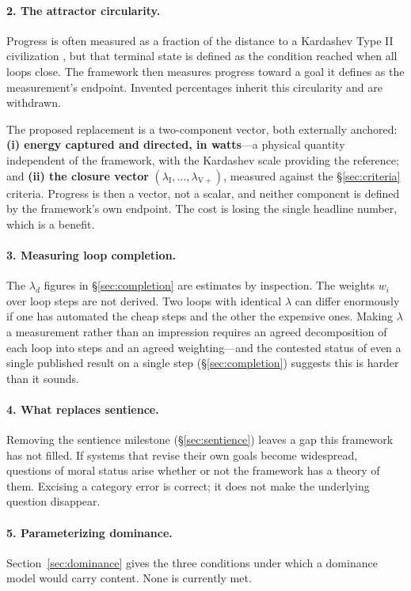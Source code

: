 \documentclass[11pt]{article}
\begin{document}
\paragraph{2. The attractor circularity.} Progress is often measured as a fraction of the distance to a Kardashev Type II civilization \citep{kardashev1964}, but that terminal state is defined as the condition reached when all loops close. The framework then measures progress toward a goal it defines as the measurement's endpoint. Invented percentages inherit this circularity and are withdrawn.

The proposed replacement is a two-component vector, both externally anchored: \textbf{(i) energy captured and directed, in watts}---a physical quantity independent of the framework, with the Kardashev scale providing the reference; and \textbf{(ii) the closure vector} $(\lambda_{\mathrm{I}},\dots,\lambda_{\mathrm{V+}})$, measured against the \S\ref{sec:criteria} criteria. Progress is then a vector, not a scalar, and neither component is defined by the framework's own endpoint. The cost is losing the single headline number, which is a benefit.

\paragraph{3. Measuring loop completion.} The $\lambda_d$ figures in \S\ref{sec:completion} are estimates by inspection. The weights $w_i$ over loop steps are not derived. Two loops with identical $\lambda$ can differ enormously if one has automated the cheap steps and the other the expensive ones. Making $\lambda$ a measurement rather than an impression requires an agreed decomposition of each loop into steps and an agreed weighting---and the contested status of even a single published result on a single step (\S\ref{sec:completion}) suggests this is harder than it sounds.

\paragraph{4. What replaces sentience.} Removing the sentience milestone (\S\ref{sec:sentience}) leaves a gap this framework has not filled. If systems that revise their own goals become widespread, questions of moral status arise whether or not the framework has a theory of them. Excising a category error is correct; it does not make the underlying question disappear.

\paragraph{5. Parameterizing dominance.} Section~\ref{sec:dominance} gives the three conditions under which a dominance model would carry content. None is currently met.
\end{document}
